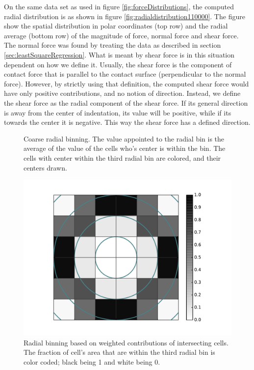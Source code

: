 \documentclass[twoside,english]{uiofysmaster}
\begin{document}
On the same data set as used in figure \ref{fig:forceDistributions}, the computed radial distribution is as shown in figure \ref{fig:radialdistribution110000}.
The figure show the spatial distribution in polar coordinates (top row) and the radial average (bottom row) of the magnitude of force, normal force and shear force.
The normal force was found by treating the data as described in section \ref{sec:leastSquareRegression}.
What is meant by shear force is in this situation dependent on how we define it. 
Usually, the shear force is the component of contact force that is parallel to the contact surface (perpendicular to the normal force). 
However, by strictly using that definition, the computed shear force would have only positive contributions, and no notion of direction.
Instead, we define the shear force as the radial component of the shear force.
If its general direction is away from the center of indentation, its value will  be positive, while if its towards the center it is negative. 
This way the shear force has a defined direction.%
\begin{figure}[H]
	\center
	\resizebox{0.4\linewidth}{!}{
		
	}
	\caption{Coarse radial binning. The value appointed to the radial bin is the average of the value of the cells who's center is within the bin. The cells with center within the third radial bin are colored, and their centers drawn.}
	\label{fig:radialBinningChoars}
\end{figure}
\vfill
\begin{figure}[H]
	\centering
	\hspace{0.74cm}
	\includegraphics[height=0.39\linewidth]{figures/forceDistribution/radialDistribution/weights.pdf}
	\caption{Radial binning based on weighted contributions of intersecting cells. The fraction of cell's area that are within the third radial bin is color coded; black being 1 and white being 0.}
	\label{fig:radialBinningWeights}
\end{figure}
\end{document}
